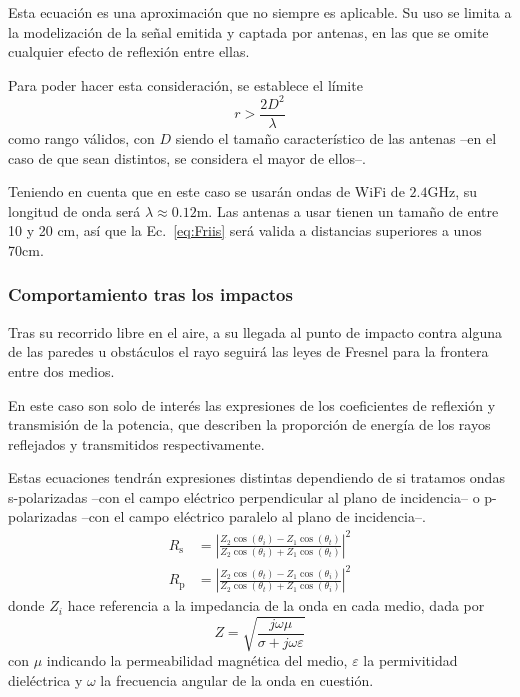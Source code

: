 Esta ecuación es una aproximación que no siempre es aplicable.
Su uso se limita a la modelización de la señal emitida y captada por antenas, en las que se omite cualquier efecto de reflexión entre ellas.

Para poder hacer esta consideración, se establece el límite
\begin{equation}
    r > \frac{2D^2}{\lambda}
\end{equation}
como rango válidos, con $D$ siendo el tamaño característico de las antenas --en el caso de que sean distintos, se considera el mayor de ellos--.

Teniendo en cuenta que en este caso se usarán ondas de WiFi de $2.4\si{\giga\hertz}$, su longitud de onda será $\lambda\approx 0.12\si{\meter}$.
Las antenas a usar tienen un tamaño de entre 10 y 20 cm, así que la Ec.~\eqref{eq:Friis} será valida a distancias superiores a unos 70cm.


\subsubsection*{Comportamiento tras los impactos}

Tras su recorrido libre en el aire, a su llegada al punto de impacto contra alguna de las paredes u obstáculos el rayo seguirá las leyes de Fresnel para la frontera entre dos medios.

En este caso son solo de interés las expresiones de los coeficientes de reflexión y transmisión de la potencia, que describen la proporción de energía de los rayos reflejados y transmitidos respectivamente.

Estas ecuaciones tendrán expresiones distintas dependiendo de si tratamos ondas s-polarizadas --con el campo eléctrico perpendicular al plano de incidencia-- o p-polarizadas --con el campo eléctrico paralelo al plano de incidencia--.\cite{5G_Simulation}
\begin{equation}
    \label{eq:coeff_reflx_1}
    \begin{aligned}
        R_\mathrm{s} &= \left|\frac{Z_2 \cos(\theta_i) - Z_1 \cos(\theta_t)}{Z_2 \cos(\theta_i) + Z_1 \cos(\theta_t)}\right|^2\\
        R_\mathrm{p} &= \left|\frac{Z_2 \cos(\theta_t) - Z_1 \cos(\theta_i)}{Z_2 \cos(\theta_t) + Z_1 \cos(\theta_i)}\right|^2
    \end{aligned}
\end{equation}
donde $Z_i$ hace referencia a la impedancia de la onda en cada medio, dada por
\begin{equation}
    Z = \sqrt{\frac{j\omega\mu}{\sigma + j\omega\varepsilon}}
\end{equation}
con $\mu$ indicando la permeabilidad magnética del medio, $\varepsilon$ la permivitidad dieléctrica y $\omega$ la frecuencia angular de la onda en cuestión.

